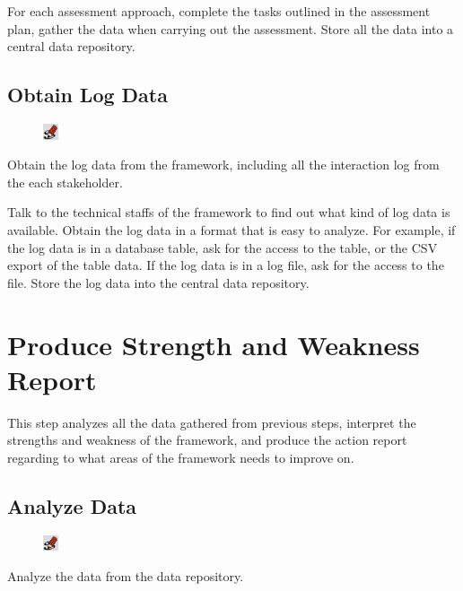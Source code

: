 \documentclass[11pt,oneside]{book}
\begin{document}
For each assessment approach, complete the tasks outlined in the assessment plan, gather the data when carrying out the 
assessment. Store all the data into a central data repository. 

\section{Obtain Log Data}
\begin{shadebox}
\begin{figure}
\vspace{-15pt}\hspace{-10pt}
    \includegraphics[width=0.04\textwidth]{note-icon}
\end{figure}
Obtain the log data from the framework, including all the interaction log from the each stakeholder.
\end{shadebox}

Talk to the technical staffs of the framework to find out what kind of log data is available. Obtain the log data in a format that 
is easy to analyze. For example, if the log data is in a database table, ask for the access to the table, or the CSV export of 
the table data. If the log data is in a log file, ask for the access to the file. Store the log data into the central data repository.

\chapter{Produce Strength and Weakness Report}

This step analyzes all the data gathered from previous steps, interpret the strengths and weakness of the framework, 
and produce the action report regarding to what areas of the framework needs to improve on.

\section{Analyze Data}
\begin{shadebox}
\begin{figure}
\vspace{-15pt}\hspace{-10pt}
    \includegraphics[width=0.04\textwidth]{note-icon}
\end{figure}
Analyze the data from the data repository.
\end{shadebox}
\end{document}
